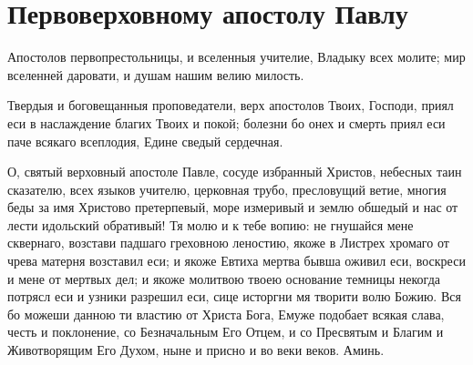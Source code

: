 

\label{_content_obiscelenii-nedugov}


\section{Первоверховному апостолу Павлу}\begin{mymulticols}


Апостолов первопрестольницы, и вселенныя учителие, Владыку всех молите; мир вселенней даровати, и душам нашим велию милость.


Твердыя и боговещанныя проповедатели, верх апостолов Твоих, Господи, приял еси в наслаждение благих Твоих и покой; болезни бо онех и смерть приял еси паче всякаго всеплодия, Едине сведый сердечная.


О, святый верховный апостоле Павле, сосуде избранный Христов, небесных таин сказателю, всех языков учителю, церковная трубо, пресловущий ветие, многия беды за имя Христово претерпевый, море измеривый и землю обшедый и нас от лести идольский обративый! Тя молю и к тебе вопию: не гнушайся мене сквернаго, возстави падшаго греховною леностию, якоже в Листрех хромаго от чрева матерня возставил еси; и якоже Евтиха мертва бывша оживил еси, воскреси и мене от мертвых дел; и якоже молитвою твоею основание темницы некогда потрясл еси и узники разрешил еси, сице исторгни мя творити волю Божию. Вся бо можеши данною ти властию от Христа Бога, Емуже подобает всякая слава, честь и поклонение, со Безначальным Его Отцем, и со Пресвятым и Благим и Животворящим Его Духом, ныне и присно и во веки веков. Аминь.

\end{mymulticols}

